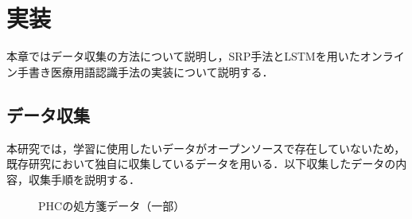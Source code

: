 
\chapter{実装}
\label{cha:imple}
本章ではデータ収集の方法について説明し，SRP手法とLSTMを用いたオンライン手書き医療用語認識手法の実装について説明する．
\section{データ収集}
\label{sec:collection}
本研究では，学習に使用したいデータがオープンソースで存在していないため，既存研究において独自に収集しているデータを用いる．以下収集したデータの内容，収集手順を説明する．

\begin{figure}[tb]
 \begin{center}
  \caption{PHCの処方箋データ（一部）}
  \label{corpus}
\end{center}
\end{figure}

